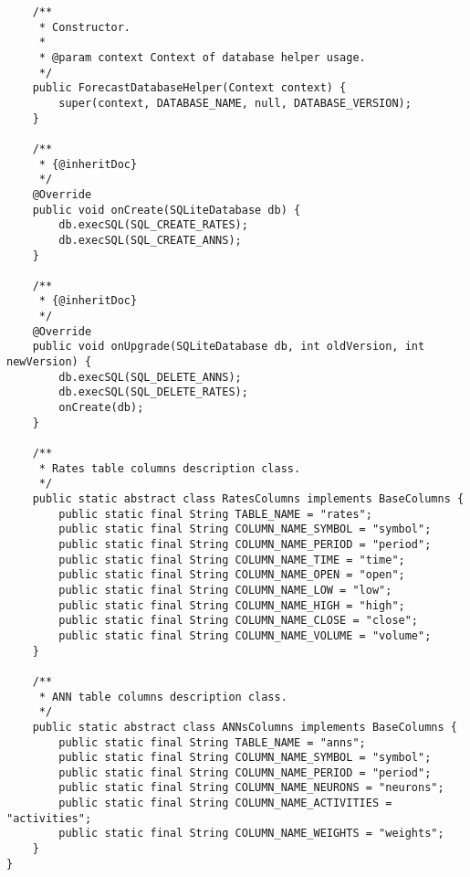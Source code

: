 \begin{verbatim}
    /**
     * Constructor.
     *
     * @param context Context of database helper usage.
     */
    public ForecastDatabaseHelper(Context context) {
        super(context, DATABASE_NAME, null, DATABASE_VERSION);
    }

    /**
     * {@inheritDoc}
     */
    @Override
    public void onCreate(SQLiteDatabase db) {
        db.execSQL(SQL_CREATE_RATES);
        db.execSQL(SQL_CREATE_ANNS);
    }

    /**
     * {@inheritDoc}
     */
    @Override
    public void onUpgrade(SQLiteDatabase db, int oldVersion, int newVersion) {
        db.execSQL(SQL_DELETE_ANNS);
        db.execSQL(SQL_DELETE_RATES);
        onCreate(db);
    }

    /**
     * Rates table columns description class.
     */
    public static abstract class RatesColumns implements BaseColumns {
        public static final String TABLE_NAME = "rates";
        public static final String COLUMN_NAME_SYMBOL = "symbol";
        public static final String COLUMN_NAME_PERIOD = "period";
        public static final String COLUMN_NAME_TIME = "time";
        public static final String COLUMN_NAME_OPEN = "open";
        public static final String COLUMN_NAME_LOW = "low";
        public static final String COLUMN_NAME_HIGH = "high";
        public static final String COLUMN_NAME_CLOSE = "close";
        public static final String COLUMN_NAME_VOLUME = "volume";
    }

    /**
     * ANN table columns description class.
     */
    public static abstract class ANNsColumns implements BaseColumns {
        public static final String TABLE_NAME = "anns";
        public static final String COLUMN_NAME_SYMBOL = "symbol";
        public static final String COLUMN_NAME_PERIOD = "period";
        public static final String COLUMN_NAME_NEURONS = "neurons";
        public static final String COLUMN_NAME_ACTIVITIES = "activities";
        public static final String COLUMN_NAME_WEIGHTS = "weights";
    }
}
\end{verbatim}

